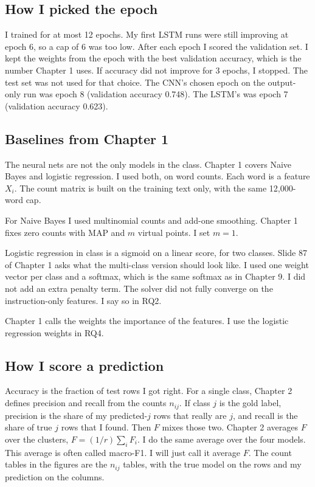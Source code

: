 \documentclass[11pt]{article}
\begin{document}
\subsection{How I picked the epoch}

I trained for at most 12 epochs. My first LSTM runs were still improving at epoch 6, so a cap of 6 was too low. After each epoch I scored the validation set. I kept the weights from the epoch with the best validation accuracy, which is the number Chapter 1 uses. If accuracy did not improve for 3 epochs, I stopped. The test set was not used for that choice. The CNN's chosen epoch on the output-only run was epoch 8 (validation accuracy 0.748). The LSTM's was epoch 7 (validation accuracy 0.623).

\subsection{Baselines from Chapter 1}

The neural nets are not the only models in the class. Chapter 1 covers Naive Bayes and logistic regression. I used both, on word counts. Each word is a feature $X_i$. The count matrix is built on the training text only, with the same 12,000-word cap.

For Naive Bayes I used multinomial counts and add-one smoothing. Chapter 1 fixes zero counts with MAP and $m$ virtual points. I set $m = 1$.

Logistic regression in class is a sigmoid on a linear score, for two classes. Slide 87 of Chapter 1 asks what the multi-class version should look like. I used one weight vector per class and a softmax, which is the same softmax as in Chapter 9. I did not add an extra penalty term. The solver did not fully converge on the instruction-only features. I say so in RQ2.

Chapter 1 calls the weights the importance of the features. I use the logistic regression weights in RQ4.

\subsection{How I score a prediction}

Accuracy is the fraction of test rows I got right. For a single class, Chapter 2 defines precision and recall from the counts $n_{ij}$. If class $j$ is the gold label, precision is the share of my predicted-$j$ rows that really are $j$, and recall is the share of true $j$ rows that I found. Then $F$ mixes those two. Chapter 2 averages $F$ over the clusters, $F = (1/r)\sum_i F_i$. I do the same average over the four models. This average is often called macro-F1. I will just call it average $F$. The count tables in the figures are the $n_{ij}$ tables, with the true model on the rows and my prediction on the columns.
\end{document}
